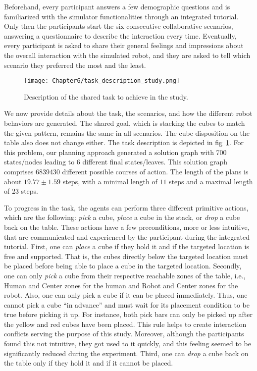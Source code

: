 Beforehand, every participant answers a few demographic questions and is familiarized with the simulator functionalities through an integrated tutorial. Only then the participants start the six consecutive collaborative scenarios, answering a questionnaire to describe the interaction every time. Eventually, every participant is asked to share their general feelings and impressions about the overall interaction with the simulated robot, and they are asked to tell which scenario they preferred the most and the least.

\begin{figure}
    \centering
    \texttt{[image: Chapter6/task\_description\_study.png]}
    \caption{Description of the shared task to achieve in the study.}
    \label{fig:task_description_study}
\end{figure}

We now provide details about the task, the scenarios, and how the different robot behaviors are generated. 
The shared goal, which is stacking the cubes to match the given pattern, remains the same in all scenarios. The cube disposition on the table also does not change either. The task description is depicted in fig~\ref{fig:task_description_study}. For this problem, our planning approach generated a solution graph with 700 states/nodes leading to 6 different final states/leaves. This solution graph comprises $6839430$ different possible courses of action. The length of the plans is about $19.77 \pm 1.59$ steps, with a minimal length of $11$ steps and a maximal length of $23$ steps.

To progress in the task, the agents can perform three different primitive actions, which are the following: \textit{pick} a cube, \textit{place} a cube in the stack, or \textit{drop} a cube back on the table.
These actions have a few preconditions, more or less intuitive, that are communicated and experienced by the participant during the integrated tutorial.
First, one can \textit{place} a cube if they hold it and if the targeted location is free and supported. That is, the cubes directly below the targeted location must be placed before being able to place a cube in the targeted location.
Secondly, one can only \textit{pick} a cube from their respective reachable zones of the table, i.e., Human and Center zones for the human and Robot and Center zones for the robot. Also, one can only pick a cube if it can be placed immediately. Thus, one cannot pick a cube ``in advance'' and must wait for its placement condition to be true before picking it up. For instance, both pick bars can only be picked up after the yellow and red cubes have been placed. This rule helps to create interaction conflicts serving the purpose of this study. Moreover, although the participants found this not intuitive, they got used to it quickly, and this feeling seemed to be significantly reduced during the experiment.
Third, one can \textit{drop} a cube back on the table only if they hold it and if it cannot be placed.

